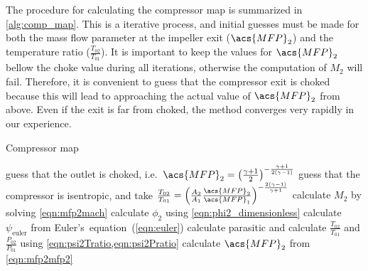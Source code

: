 \documentclass[tcc]{subfiles}
\begin{document}
The procedure for calculating the compressor map is summarized in \cref{alg:comp_map}. 
This is a iterative process, and initial guesses must be made for both 
the mass flow parameter at the impeller exit ($\acs{MFP}_2$) and the temperature ratio 
($\tfrac{T_{02}}{T_{01}}$). 
It is important to keep the values for $\acs{MFP}_2$ bellow the choke value during all iterations,
otherwise the computation of $M_2$ will fail. 
Therefore, it is convenient to guess that the compressor exit is choked because this will lead 
to approaching the actual value of $\acs{MFP}_2$ from above.
Even if the exit is far from choked, the method converges very rapidly in our experience.

\begin{algorithm}
    \caption{Compressor map}
    \label{alg:comp_map}

    
    guess that the outlet is choked, i.e.\ 
        $\acs{MFP}_2 = \left( \frac{\gamma+1}{2}\right)^{-\frac{\gamma+1}{2(\gamma-1)}} $\;
    guess that the compressor is isentropic, and take
     $\frac{T_{02}}{T_{01}} = \left(\frac{A_2}{A_1}\frac{\acs{MFP}_2}{\acs{MFP}_1}\right)^{-\frac{2(\gamma-1)}{\gamma+1}} $\;
    \Repeat{$\acs{MFP}_2$ converges} {
        calculate $M_2$ by solving \cref{eqn:mfp2mach}\;
        calculate $\phi_2$ using \cref{eqn:phi2_dimensionless}\;
        calculate $\psi_\text{euler}$ from Euler's~equation~(\ref{eqn:euler})\;
        calculate parasitic and 
        calculate $\frac{T_{02}}{T_{01}}$ and $\frac{P_{02}}{P_{01}}$ 
            using \cref{eqn:psi2Tratio,eqn:psi2Pratio} \;
        calculate $\acs{MFP}_2$ from \cref{eqn:mfp2mfp2}\;
}

\end{algorithm}
\end{document}
